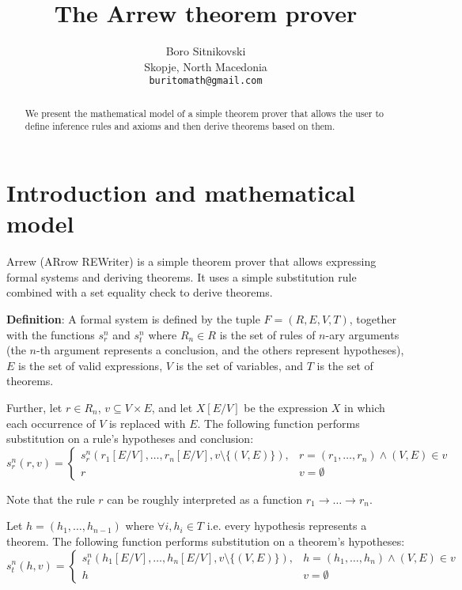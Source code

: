\documentclass{article}
\title{The Arrew theorem prover}
\author{
  Boro Sitnikovski \\
  Skopje, North Macedonia \\
  \texttt{buritomath@gmail.com} \\
}
\begin{document}
\maketitle

\begin{abstract}
We present the mathematical model of a simple theorem prover that allows the user to define inference rules and axioms and then derive theorems based on them.
\end{abstract}


\section{Introduction and mathematical model}

Arrew (ARrow REWriter) is a simple theorem prover that allows expressing formal systems and deriving theorems. It uses a simple substitution rule combined with a set equality check to derive theorems.

\textbf{Definition}: A formal system is defined by the tuple $F = (R, E, V, T)$, together with the functions $s_r^n$ and $s_t^n$ where $R_n \in R$ is the set of rules of $n$-ary arguments (the $n$-th argument represents a conclusion, and the others represent hypotheses), $E$ is the set of valid expressions, $V$ is the set of variables, and $T$ is the set of theorems.

Further, let $r \in R_n$, $v \subseteq V \times E$, and let $X[E/V]$ be the expression $X$ in which each occurrence of $V$ is replaced with $E$. The following function performs substitution on a rule's hypotheses and conclusion:
$$ s_r^n(r, v) = {
\begin{cases}
s_r^n(r_1[E/V], \ldots, r_n[E/V], v \setminus \{(V, E) \}), & r = (r_1, \ldots, r_n) \land (V, E) \in v \\
r & v = \emptyset
\end{cases}}
$$

Note that the rule $r$ can be roughly interpreted as a function $r_1 \to \ldots \to r_n$.

Let $h = (h_1, \ldots, h_{n-1})$ where $\forall i, h_i \in T$ i.e. every hypothesis represents a theorem. The following function performs substitution on a theorem's hypotheses:
$$ s_t^n(h, v) = {
\begin{cases}
s_t^n(h_1[E/V], \ldots, h_n[E/V], v \setminus \{(V, E) \}), & h = (h_1, \ldots, h_n) \land (V, E) \in v \\
h & v = \emptyset
\end{cases}}
$$
\end{document}
